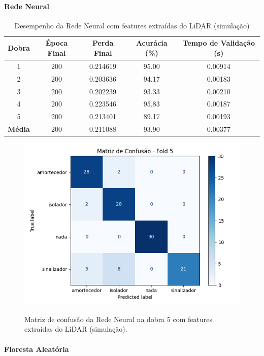 \paragraph{Rede Neural}

\begin{table}[H]
\centering
\caption{Desempenho da Rede Neural com features extraídas do LiDAR (simulação)}
\label{tab:rede_neural_lidar_features}
\begin{tabular}{ccccc}
\hline
\textbf{Dobra} & \textbf{Época Final} & \textbf{Perda Final} & \textbf{Acurácia (\%)} & \textbf{Tempo de Validação (s)} \\
\hline
1 & 200 & 0.214619 & 95.00 & 0.00914 \\
2 & 200 & 0.203636 & 94.17 & 0.00183 \\
3 & 200 & 0.202239 & 93.33 & 0.00210 \\
4 & 200 & 0.223546 & 95.83 & 0.00187 \\
5 & 200 & 0.213401 & 89.17 & 0.00193 \\
\hline
\textbf{Média} & 200 & 0.211088 & 93.90 & 0.00377 \\
\hline
\end{tabular}
\fonte{}
\end{table}

\begin{figure}[H]
\caption{Matriz de confusão da Rede Neural na dobra 5 com features extraídas do LiDAR (simulação).}
\includegraphics[width=0.7\linewidth]{figuras/Resultados/simu_principal_Teste4_nn.png}
\fonte{}
\label{fig:matriz_confusao_nn_lidar_features}
\end{figure}


\paragraph{Floresta Aleatória}


